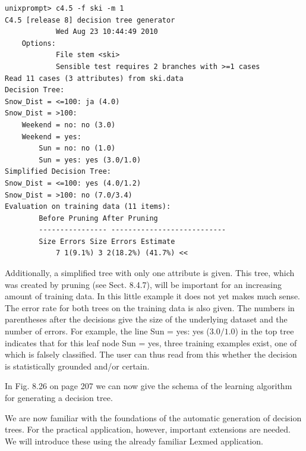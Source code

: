 \documentclass[10pt]{book}
\begin{document}
\begin{verbatim}
unixprompt> c4.5 -f ski -m 1
C4.5 [release 8] decision tree generator
            Wed Aug 23 10:44:49 2010
    Options:
            File stem <ski>
            Sensible test requires 2 branches with >=1 cases
Read 11 cases (3 attributes) from ski.data
Decision Tree:
Snow_Dist = <=100: ja (4.0)
Snow_Dist = >100:
    Weekend = no: no (3.0)
    Weekend = yes:
        Sun = no: no (1.0)
        Sun = yes: yes (3.0/1.0)
Simplified Decision Tree:
Snow_Dist = <=100: yes (4.0/1.2)
Snow_Dist = >100: no (7.0/3.4)
Evaluation on training data (11 items):
        Before Pruning After Pruning
        ---------------- ---------------------------
        Size Errors Size Errors Estimate
            7 1(9.1%) 3 2(18.2%) (41.7%) <<
\end{verbatim}

Additionally, a simplified tree with only one attribute is given. This tree, which was created by pruning (see Sect. 8.4.7), will be important for an increasing amount of training data. In this little example it does not yet makes much sense. The error rate for both trees on the training data is also given. The numbers in parentheses after the decisions give the size of the underlying dataset and the number of errors. For example, the line Sun = yes: yes ($3.0 / 1.0$) in the top tree indicates that for this leaf node Sun = yes, three training examples exist, one of which is falsely classified. The user can thus read from this whether the decision is statistically grounded and/or certain.

In Fig. 8.26 on page 207 we can now give the schema of the learning algorithm for generating a decision tree.

We are now familiar with the foundations of the automatic generation of decision trees. For the practical application, however, important extensions are needed. We will introduce these using the already familiar Lexmed application.
\end{document}
